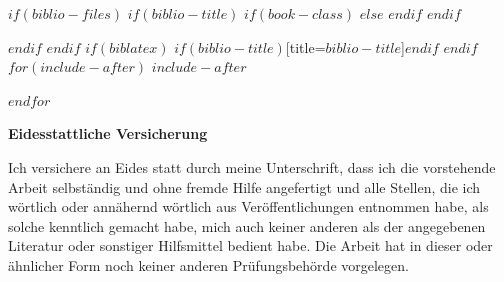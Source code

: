 \documentclass[$if(fontsize)$$fontsize$,$endif$$if(lang)$$lang$,$endif$$if(papersize)$$papersize$,$endif$$for(classoption)$$classoption$$sep$,$endfor$]{$documentclass$}
\begin{document}
$if(biblio-files)$
$if(biblio-title)$
$if(book-class)$
\renewcommand\bibname{$biblio-title$}
$else$
\renewcommand\refname{$biblio-title$}
$endif$
$endif$


$endif$
$endif$
$if(biblatex)$
\renewcommand*{\mkbibnamefamily}[1]{\textbf{#1}}
\renewcommand*{\mkbibnamegiven}[1]{\textbf{#1}}
\renewcommand*{\mkbibnameprefix}[1]{\textbf{#1}}
\renewcommand*{\mkbibnamesuffix}[1]{\textbf{#1}}
\printbibliography$if(biblio-title)$[title=$biblio-title$]$endif$
$endif$
$for(include-after)$
$include-after$

$endfor$

\newpage
\textbf{Eidesstattliche Versicherung}

\bigskip

Ich versichere an Eides statt durch meine Unterschrift, dass ich die vorstehende Arbeit selbständig und ohne fremde Hilfe angefertigt und alle Stellen, die ich wörtlich oder annähernd wörtlich aus Veröffentlichungen entnommen habe, als solche kenntlich gemacht habe, mich auch keiner anderen als der angegebenen Literatur oder sonstiger Hilfsmittel bedient habe. Die Arbeit hat in dieser oder ähnlicher Form noch keiner anderen Prüfungsbehörde vorgelegen.

\vspace{1cm}
\rule{0pt}{2\baselineskip} %
\par\noindent{} \hfill\makebox[2.25in]{\hrulefill}%
\par\noindent\makebox[2.25in][l]{} \hfill{}%
\end{document}
